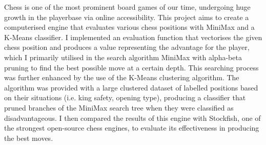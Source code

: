 Chess is one of the most prominent board games of our time, undergoing huge growth in the playerbase via online accessibility. This project aims to create a computerised engine that evaluates various chess positions with MiniMax and a K-Means classifier. I implemented an evaluation function that vectorises the given chess position and produces a value representing the advantage for the player, which I primarily utilised in the search algorithm MiniMax with alpha-beta pruning to find the best possible move at a certain depth. This searching process was further enhanced by the use of the K-Means clustering algorithm. The algorithm was provided with a large clustered dataset of labelled positions based on their situations (i.e. king safety, opening type), producing a classifier that pruned branches of the MiniMax search tree when they were classified as disadvantageous. I then compared the results of this engine with Stockfish, one of the strongest open-source chess engines, to evaluate its effectiveness in producing the best moves. 